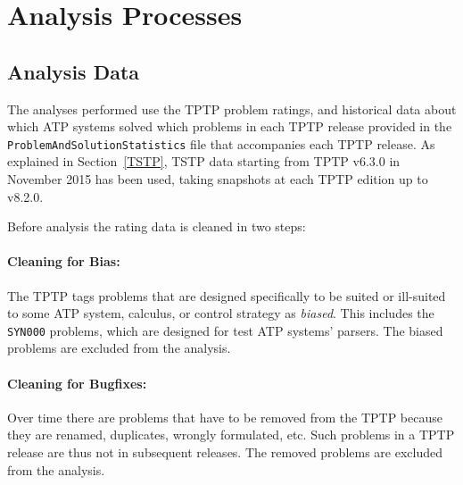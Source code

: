 \documentclass[runningheads]{llncs}
\begin{document}
\section{Analysis Processes}
\label{AnalysisProcesses}

\subsection{Analysis Data}
\label{AnalysisData}

The analyses performed use the TPTP problem ratings, and historical data about which
ATP systems solved which problems in each TPTP release provided in the 
{\tt ProblemAndSolutionStatistics} file that accompanies each TPTP release.
As explained in Section~\ref{TSTP}, TSTP data starting from TPTP v6.3.0 in November 2015 has been
used, taking snapshots at each TPTP edition up to v8.2.0.

Before analysis the rating data is cleaned in two steps:

\paragraph{Cleaning for Bias:}
The TPTP tags problems that are designed specifically to be suited or ill-suited to some ATP 
system, calculus, or control strategy as {\em biased}. 
This includes the {\tt SYN000} problems, which are designed for test ATP systems' parsers.
The biased problems are excluded from the analysis.

\paragraph{Cleaning for Bugfixes:}
Over time there are problems that have to be removed from the TPTP because they are renamed,
duplicates, wrongly formulated, etc.
Such problems in a TPTP release are thus not in subsequent releases.
The removed problems are excluded from the analysis.
\end{document}
